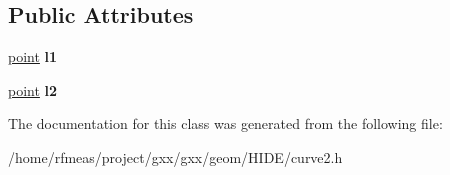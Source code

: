 \subsection*{Public Attributes}
\begin{DoxyCompactItemize}
\item 
\hyperlink{classmalgo_1_1vector2}{point} {\bfseries l1}\hypertarget{classgxx_1_1curve2_1_1line__segment_aa9cdd5652cdc9e75d1e2e221ef3eebfe}{}\label{classgxx_1_1curve2_1_1line__segment_aa9cdd5652cdc9e75d1e2e221ef3eebfe}

\item 
\hyperlink{classmalgo_1_1vector2}{point} {\bfseries l2}\hypertarget{classgxx_1_1curve2_1_1line__segment_a4183c0d764576bb58c4812f9db8726cb}{}\label{classgxx_1_1curve2_1_1line__segment_a4183c0d764576bb58c4812f9db8726cb}

\end{DoxyCompactItemize}


The documentation for this class was generated from the following file\+:\begin{DoxyCompactItemize}
\item 
/home/rfmeas/project/gxx/gxx/geom/\+H\+I\+D\+E/curve2.\+h\end{DoxyCompactItemize}
